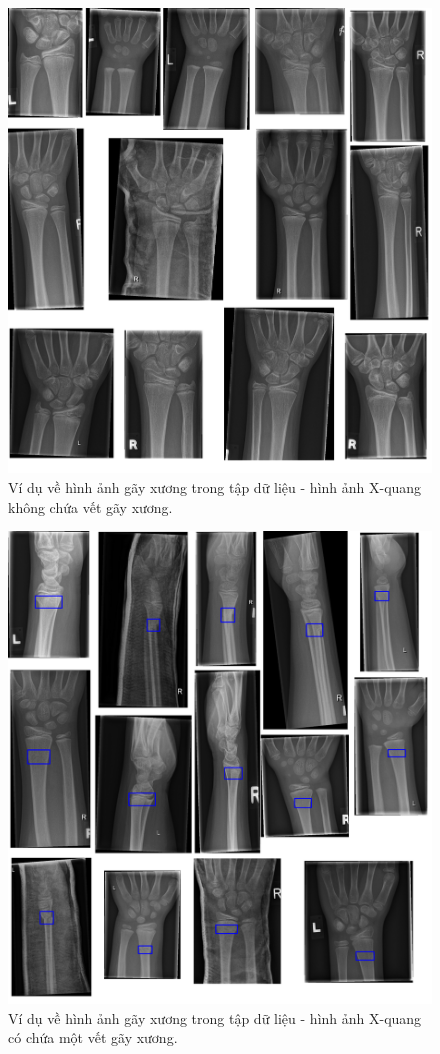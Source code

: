 \documentclass[../the.tex]{subfiles}
\begin{document}
\begin{figure}[H]
\centering
	\includegraphics[width=1\textwidth]{images/dataset_0.png}
	\caption{Ví dụ về hình ảnh gãy xương trong tập dữ liệu - hình ảnh X-quang không chứa vết gãy xương.}
	\label{fig:dataset_0}
\end{figure}


\begin{figure}[H]
\centering
	\includegraphics[width=1\textwidth]{images/dataset_1.png}
	\caption{Ví dụ về hình ảnh gãy xương trong tập dữ liệu - hình ảnh X-quang có chứa một vết gãy xương.}
	\label{fig:dataset_1}
\end{figure}
\end{document}
